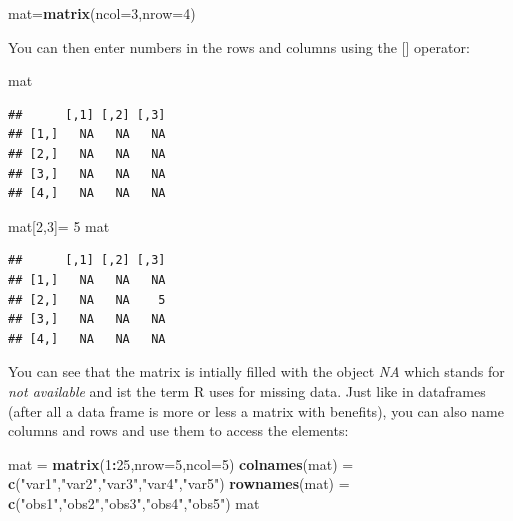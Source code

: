 \documentclass[]{article}
\newenvironment{Shaded}{\begin{snugshade}}{\end{snugshade}}
\newcommand{\DataTypeTok}[1]{\textcolor[rgb]{0.13,0.29,0.53}{#1}}
\newcommand{\DecValTok}[1]{\textcolor[rgb]{0.00,0.00,0.81}{#1}}
\newcommand{\KeywordTok}[1]{\textcolor[rgb]{0.13,0.29,0.53}{\textbf{#1}}}
\newcommand{\NormalTok}[1]{#1}
\newcommand{\OperatorTok}[1]{\textcolor[rgb]{0.81,0.36,0.00}{\textbf{#1}}}
\newcommand{\StringTok}[1]{\textcolor[rgb]{0.31,0.60,0.02}{#1}}
\begin{document}
\begin{Shaded}
\begin{Highlighting}[]
\NormalTok{mat=}\KeywordTok{matrix}\NormalTok{(}\DataTypeTok{ncol=}\DecValTok{3}\NormalTok{,}\DataTypeTok{nrow=}\DecValTok{4}\NormalTok{)}
\end{Highlighting}
\end{Shaded}

You can then enter numbers in the rows and columns using the {[}{]}
operator:

\begin{Shaded}
\begin{Highlighting}[]
\NormalTok{mat}
\end{Highlighting}
\end{Shaded}

\begin{verbatim}
##      [,1] [,2] [,3]
## [1,]   NA   NA   NA
## [2,]   NA   NA   NA
## [3,]   NA   NA   NA
## [4,]   NA   NA   NA
\end{verbatim}

\begin{Shaded}
\begin{Highlighting}[]
\NormalTok{mat[}\DecValTok{2}\NormalTok{,}\DecValTok{3}\NormalTok{]=}\StringTok{ }\DecValTok{5} 
\NormalTok{mat}
\end{Highlighting}
\end{Shaded}

\begin{verbatim}
##      [,1] [,2] [,3]
## [1,]   NA   NA   NA
## [2,]   NA   NA    5
## [3,]   NA   NA   NA
## [4,]   NA   NA   NA
\end{verbatim}

You can see that the matrix is intially filled with the object \emph{NA}
which stands for \emph{not available} and ist the term R uses for
missing data. Just like in dataframes (after all a data frame is more or
less a matrix with benefits), you can also name columns and rows and use
them to access the elements:

\begin{Shaded}
\begin{Highlighting}[]
\NormalTok{mat =}\StringTok{ }\KeywordTok{matrix}\NormalTok{(}\DecValTok{1}\OperatorTok{:}\DecValTok{25}\NormalTok{,}\DataTypeTok{nrow=}\DecValTok{5}\NormalTok{,}\DataTypeTok{ncol=}\DecValTok{5}\NormalTok{)}
\KeywordTok{colnames}\NormalTok{(mat) =}\StringTok{ }\KeywordTok{c}\NormalTok{(}\StringTok{"var1"}\NormalTok{,}\StringTok{"var2"}\NormalTok{,}\StringTok{"var3"}\NormalTok{,}\StringTok{"var4"}\NormalTok{,}\StringTok{"var5"}\NormalTok{)}
\KeywordTok{rownames}\NormalTok{(mat) =}\StringTok{ }\KeywordTok{c}\NormalTok{(}\StringTok{"obs1"}\NormalTok{,}\StringTok{"obs2"}\NormalTok{,}\StringTok{"obs3"}\NormalTok{,}\StringTok{"obs4"}\NormalTok{,}\StringTok{"obs5"}\NormalTok{)}
\NormalTok{mat}
\end{Highlighting}
\end{Shaded}
\end{document}
